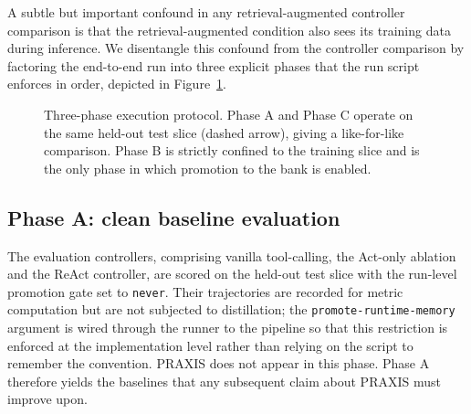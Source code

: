 \documentclass[conference]{IEEEtran}
\begin{document}
A subtle but important confound in any retrieval-augmented
controller comparison is that the retrieval-augmented condition
also sees its training data during inference. We disentangle this
confound from the controller comparison by factoring the
end-to-end run into three explicit phases that the run script
enforces in order, depicted in Figure~\ref{fig:phases}.

\begin{figure}[t]
\centering
{}
\caption{Three-phase execution protocol. Phase A and Phase C
operate on the same held-out test slice (dashed arrow), giving a
like-for-like comparison. Phase B is strictly confined to the
training slice and is the only phase in which promotion to the
bank is enabled.}
\label{fig:phases}
\end{figure}

\subsection{Phase A: clean baseline evaluation}

The evaluation controllers, comprising vanilla tool-calling, the
Act-only ablation and the ReAct controller, are scored on the
held-out test slice with the run-level promotion gate set to
\texttt{never}. Their trajectories are recorded for metric
computation but are not subjected to distillation; the
\texttt{promote-runtime-memory} argument is wired through the
runner to the pipeline so that this restriction is enforced at
the implementation level rather than relying on the script to
remember the convention. PRAXIS does not appear in this phase.
Phase A therefore yields the baselines that any subsequent claim
about PRAXIS must improve upon.
\end{document}
